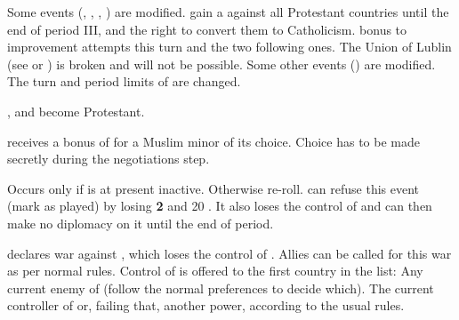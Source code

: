 \begin{digressions}

  \aparag[\CATHCR]
  \bparag Some events (, , , ) are
  modified.
  \bparag \POL gain a \CB against all Protestant countries until the end of
  period III, and the right to convert them to Catholicism.
  \aparag[\CATHCO]
  \bparag {} bonus to \STAB improvement attempts this turn and the two
  following ones.
  \aparag[Protestantism]
  \bparag The Union of Lublin (see  or
  ) is broken and will not be possible. Some other
  events () are modified.
  \bparag The turn and period limits of \POL are changed.
\end{digressions}





\phevnt
\aparag[Calvin] \paysPalatinat, \paysThuringe and \paysecosse become
Protestant.






\phdipl
\aparag \TUR receives a bonus of  for a Muslim minor of its
choice. Choice has to be made secretly during the negotiations step.





\condition{}
\aparag Occurs only if \paysecosse is at present inactive. Otherwise re-roll.
\aparag \ENG can refuse this event (mark as played) by losing {\bf 2} \STAB
and 20 \VP. It also loses the control of \paysecosse and can then make no
diplomacy on it until the end of period.

\phevnt
\aparag \paysecosse declares war against \ENG, which loses the control of
\paysecosse.
\aparag Allies can be called for this war as per normal rules.
\aparag Control of \paysecosse is offered to the first country in the list:
\bparag Any current enemy of \ENG (follow the normal preferences to decide
which).
\bparag The current controller of \paysecosse or, failing that, another power,
according to the usual rules.

